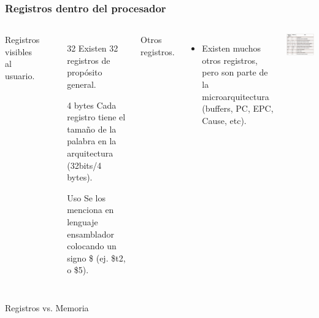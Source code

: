 \documentclass[aspectratio=169,compress]{beamer}
\begin{document}
\begin{footnotesize}
\begin{frame}
\frametitle{Registros dentro del procesador}
 \begin{columns}[onlytextwidth,T]
      \column{\dimexpr\linewidth-60mm-5mm}

Registros visibles al usuario.
        \begin{itemize}
\bigskip
  \item[32] Existen 32 registros de propósito general.
  \item[4 bytes] Cada registro tiene el tamaño de la palabra en la arquitectura (32bits/4 bytes).
  \item[Uso] Se los menciona en lenguaje ensamblador colocando un signo \$ (ej. \$t2, o \$5).

        \end{itemize}

Otros registros.
        \begin{itemize}
  \item Existen muchos otros registros, pero son parte de la microarquitectura (buffers, PC, EPC, Cause, etc).
        \end{itemize}
      \column{60mm}
    \includegraphics[width=65mm]{images/convencion.jpg}

    \end{columns}


\end{frame}



\begin{frame}{Registros vs. Memoria}


\end{frame}
\end{footnotesize}
\end{document}
